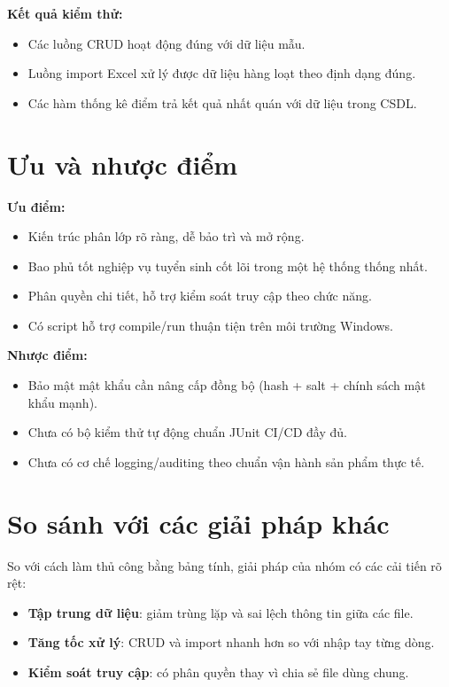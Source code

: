 \documentclass[12pt,a4paper,oneside]{report}
\begin{document}
\textbf{Kết quả kiểm thử:}
\begin{itemize}
  \item Các luồng CRUD hoạt động đúng với dữ liệu mẫu.
  \item Luồng import Excel xử lý được dữ liệu hàng loạt theo định dạng đúng.
  \item Các hàm thống kê điểm trả kết quả nhất quán với dữ liệu trong CSDL.
\end{itemize}

\section{Ưu và nhược điểm}
\textbf{Ưu điểm:}
\begin{itemize}
  \item Kiến trúc phân lớp rõ ràng, dễ bảo trì và mở rộng.
  \item Bao phủ tốt nghiệp vụ tuyển sinh cốt lõi trong một hệ thống thống nhất.
  \item Phân quyền chi tiết, hỗ trợ kiểm soát truy cập theo chức năng.
  \item Có script hỗ trợ compile/run thuận tiện trên môi trường Windows.
\end{itemize}

\textbf{Nhược điểm:}
\begin{itemize}
  \item Bảo mật mật khẩu cần nâng cấp đồng bộ (hash + salt + chính sách mật khẩu mạnh).
  \item Chưa có bộ kiểm thử tự động chuẩn JUnit CI/CD đầy đủ.
  \item Chưa có cơ chế logging/auditing theo chuẩn vận hành sản phẩm thực tế.
\end{itemize}

\section{So sánh với các giải pháp khác}
So với cách làm thủ công bằng bảng tính, giải pháp của nhóm có các cải tiến rõ rệt:
\begin{itemize}
  \item \textbf{Tập trung dữ liệu}: giảm trùng lặp và sai lệch thông tin giữa các file.
  \item \textbf{Tăng tốc xử lý}: CRUD và import nhanh hơn so với nhập tay từng dòng.
  \item \textbf{Kiểm soát truy cập}: có phân quyền thay vì chia sẻ file dùng chung.
\end{itemize}
\end{document}
